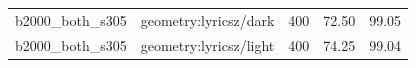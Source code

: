 \begin{longtable}{l>{\raggedright\arraybackslash}p{.42\linewidth}rrr}
b2000\_\allowbreak{}both\_\allowbreak{}s305 & %
geometry:lyricsz/dark & %
400 & %
72.50 & %
99.05 \\ %

b2000\_\allowbreak{}both\_\allowbreak{}s305 & %
geometry:lyricsz/light & %
400 & %
74.25 & %
99.04 \\ %


\end{longtable}

